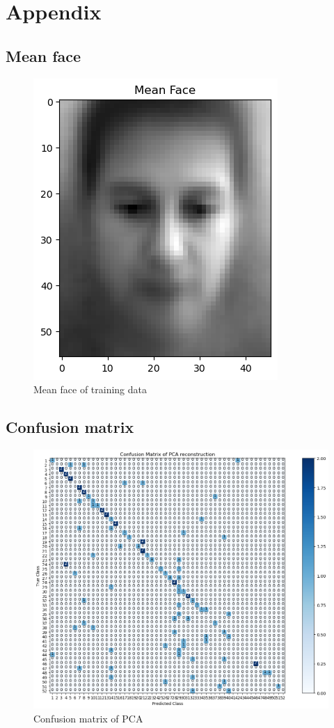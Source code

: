 \section{Appendix}

\subsection{Mean face}
\begin{figure}
	\centering
	\includegraphics[width=0.4\linewidth]{image/q1_meanface.png} %
	
	\caption{Mean face of training data}
	\label{fig:q1_meanface}
\end{figure}

\subsection{Confusion matrix}
\begin{figure}
	\centering
	\includegraphics[width=0.4\linewidth]{image/q1_cm.png} %
	
	\caption{Confusion matrix of PCA}
	\label{fig:q1_cm}
\end{figure}

